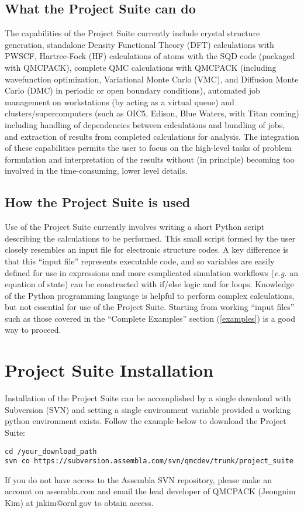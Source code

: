 \documentclass[oneside,11pt]{memoir}
\numberwithin{equation}{section}
\begin{document}
\section{What the Project Suite can do}
The capabilities of the Project Suite currently include crystal structure 
generation, standalone Density Functional Theory (DFT) calculations with PWSCF, 
Hartree-Fock (HF) calculations of atoms with the SQD code (packaged with 
QMCPACK), complete QMC calculations with QMCPACK (including wavefunction 
optimization, Variational Monte Carlo (VMC), and Diffusion Monte Carlo (DMC) in 
periodic or open boundary conditions), automated job management on workstations 
(by acting as a virtual queue) and clusters/supercomputers (such as OIC5, 
Edison, Blue Waters, with Titan coming) including handling of dependencies 
between calculations and bundling of jobs,  and extraction of results from 
completed calculations for analysis.  The integration of these capabilities 
permits the user to focus on the high-level tasks of problem formulation and 
interpretation of the results without (in principle) becoming too involved 
in the time-consuming, lower level details.

\section{How the Project Suite is used}
Use of the Project Suite currently involves writing a short Python script 
describing the calculations to be performed.  This small script formed by the 
user closely resembles an input file for electronic structure codes.  A key 
difference is that this ``input file'' represents executable code, and so 
variables are easily defined for use in expressions and more complicated 
simulation workflows (\emph{e.g.} an equation of state) can be constructed 
with if/else logic and for loops.  Knowledge of the Python programming language 
is helpful to perform complex calculations, but not essential for use of the 
Project Suite.  Starting from working ``input files'' such as those covered 
in the ``Complete Examples'' section (\ref{examples}) is a good way to proceed. 


\pagebreak
\chapter{Project Suite Installation} \label{installation}
Installation of the Project Suite can be accomplished by a single download 
with Subversion (SVN) and setting a single environment variable provided a 
working python environment exists. Follow the example below to download the 
Project Suite:
\begin{shaded}
\begin{verbatim}
cd /your_download_path
svn co https://subversion.assembla.com/svn/qmcdev/trunk/project_suite
\end{verbatim}
\end{shaded}
If you do not have access to the Assembla SVN repository, please make an 
account on assembla.com and email the lead developer of QMCPACK (Jeongnim Kim) 
at jnkim@ornl.gov to obtain access.
\end{document}
